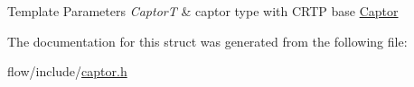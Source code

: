\begin{DoxyTemplParams}{Template Parameters}
{\em CaptorT} & captor type with C\+R\+TP base {\ttfamily \hyperlink{classflow_1_1_captor}{Captor}} \\
\hline
\end{DoxyTemplParams}


The documentation for this struct was generated from the following file\+:\begin{DoxyCompactItemize}
\item 
flow/include/\hyperlink{captor_8h}{captor.\+h}\end{DoxyCompactItemize}
